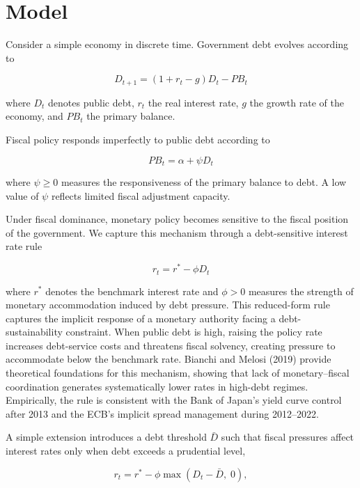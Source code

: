 \documentclass[3p]{elsarticle}
\begin{document}
\section{Model}

Consider a simple economy in discrete time. Government debt evolves according to

\begin{equation}
D_{t+1} = (1+r_t-g)D_t - PB_t
\end{equation}

where $D_t$ denotes public debt, $r_t$ the real interest rate, $g$ the growth rate of the
economy, and $PB_t$ the primary balance.

Fiscal policy responds imperfectly to public debt according to

\begin{equation}
PB_t = \alpha + \psi D_t
\end{equation}

where $\psi \geq 0$ measures the responsiveness of the primary balance to debt. A low
value of $\psi$ reflects limited fiscal adjustment capacity.

Under fiscal dominance, monetary policy becomes sensitive to the fiscal position of the
government. We capture this mechanism through a debt-sensitive interest rate rule

\begin{equation}
r_t = r^{*} - \phi D_t
\end{equation}

where $r^{*}$ denotes the benchmark interest rate and $\phi>0$ measures the strength
of monetary accommodation induced by debt pressure. This reduced-form rule captures the
implicit response of a monetary authority facing a debt-sustainability constraint. When
public debt is high, raising the policy rate increases debt-service costs and threatens
fiscal solvency, creating pressure to accommodate below the benchmark rate. Bianchi and
Melosi (2019) provide theoretical foundations for this mechanism, showing that lack of
monetary--fiscal coordination generates systematically lower rates in high-debt regimes.
Empirically, the rule is consistent with the Bank of Japan's yield curve control after
2013 and the ECB's implicit spread management during 2012--2022.

A simple extension introduces a debt threshold $\bar{D}$ such that fiscal pressures
affect interest rates only when debt exceeds a prudential level,

\[
r_t = r^{*} - \phi \max(D_t - \bar{D},\; 0),
\]
\end{document}
